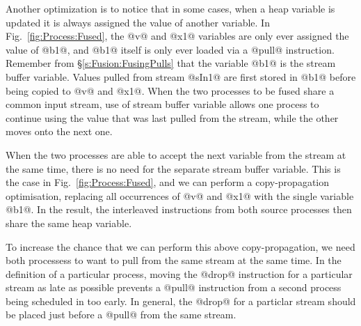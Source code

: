Another optimization is to notice that in some cases, when a heap variable is updated it is always assigned the value of another variable. In Fig.~\ref{fig:Process:Fused}, the @v@ and @x1@ variables are only ever assigned the value of @b1@, and @b1@ itself is only ever loaded via a @pull@ instruction. Remember from \S\ref{s:Fusion:FusingPulls} that the variable @b1@ is the stream buffer variable. Values pulled from stream @sIn1@ are first stored in @b1@ before being copied to @v@ and @x1@. When the two processes to be fused share a common input stream, use of stream buffer variable allows one process to continue using the value that was last pulled from the stream, while the other moves onto the next one. 

When the two processes are able to accept the next variable from the stream at the same time, there is no need for the separate stream buffer variable. This is the case in Fig.~\ref{fig:Process:Fused}, and we can perform a copy-propagation optimisation, replacing all occurrences of @v@ and @x1@ with the single variable @b1@. In the result, the interleaved instructions from both source processes then share the same heap variable.

To increase the chance that we can perform this above copy-propagation, we need both processess to want to pull from the same stream at the same time. In the definition of a particular process, moving the @drop@ instruction for a particular stream as late as possible prevents a @pull@ instruction from a second process being scheduled in too early. In general, the @drop@ for a particlar stream should be placed just before a @pull@ from the same stream. 






